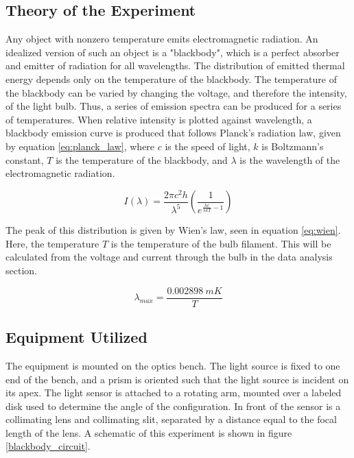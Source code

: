 \documentclass[a4paper]{article}
\begin{document}
\subsection{Theory of the Experiment}

\qq Any object with nonzero temperature emits electromagnetic radiation. An idealized version of such an object is a "blackbody", which is a perfect absorber and emitter of radiation for all wavelengths. The distribution of emitted thermal energy depends only on the temperature of the blackbody. The temperature of the blackbody can be varied by changing the voltage, and therefore the intensity, of the light bulb. Thus, a series of emission spectra can be produced for a series of temperatures. When relative intensity is plotted against wavelength, a blackbody emission curve is produced that follows Planck's radiation law, given by equation \ref{eq:planck_law}, where $c$ is the speed of light, $k$ is Boltzmann's constant, $T$ is the temperature of the blackbody, and $\lambda$ is the wavelength of the electromagnetic radiation.

\begin{equation}
\label{eq:planck_law}
I \left( \lambda \right) = 
\frac{2 \pi c^2 h}{\lambda^5}
\left( \frac{1}{e^{\frac{hc}{\lambda k T} - 1}} \right)
\end{equation}

\qq The peak of this distribution is given by Wien's law, seen in equation \ref{eq:wien}. Here, the temperature $T$ is the temperature of the bulb filament. This will be calculated from the voltage and current through the bulb in the data analysis section.

\begin{equation}
\label{eq:wien}
\lambda_{max} = \frac{0.002898 \: mK}{T}
\end{equation}

\subsection{Equipment Utilized}

\qq The equipment is mounted on the optics bench. The light source is fixed to one end of the bench, and a prism is oriented such that the light source is incident on its apex. The light sensor is attached to a rotating arm, mounted over a labeled disk used to determine the angle of the configuration. In front of the sensor is a collimating lens and collimating slit, separated by a distance equal to the focal length of the lens. A schematic of this experiment is shown in figure \ref{blackbody_circuit}. \\
\end{document}
